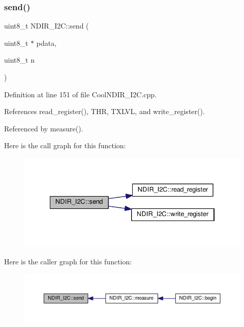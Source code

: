 \subsubsection{\texorpdfstring{send()}{send()}}
{\footnotesize\ttfamily uint8\+\_\+t N\+D\+I\+R\+\_\+\+I2\+C\+::send (\begin{DoxyParamCaption}\item[{uint8\+\_\+t $\ast$}]{pdata,  }\item[{uint8\+\_\+t}]{n }\end{DoxyParamCaption})\hspace{0.3cm}{\ttfamily [private]}}



Definition at line 151 of file Cool\+N\+D\+I\+R\+\_\+\+I2\+C.\+cpp.



References read\+\_\+register(), T\+HR, T\+X\+L\+VL, and write\+\_\+register().



Referenced by measure().

Here is the call graph for this function\+:\nopagebreak
\begin{figure}[H]
\begin{center}
\leavevmode
\includegraphics[width=334pt]{d6/ddb/class_n_d_i_r___i2_c_aab0c04c2b7d08e99d12af044df179f0c_cgraph}
\end{center}
\end{figure}
Here is the caller graph for this function\+:\nopagebreak
\begin{figure}[H]
\begin{center}
\leavevmode
\includegraphics[width=350pt]{d6/ddb/class_n_d_i_r___i2_c_aab0c04c2b7d08e99d12af044df179f0c_icgraph}
\end{center}
\end{figure}
\mbox{\label{class_n_d_i_r___i2_c_aa6d2b8dd287f9c9015461cebb18f9abc}} 
